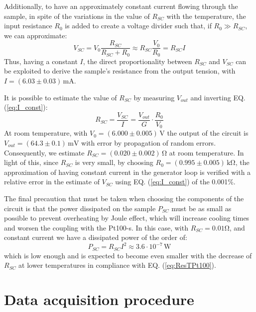 \documentclass[rmp,10pt,onecolumn,fleqn,notitlepage]{revtex4-1}
\begin{document}
Additionally, to have an approximately constant current flowing through the sample, in spite of the variations in the value of $R_{SC}$ with the temperature, the input resistance $R_0$ is added to create a voltage divider such that, if $R_0 \gg R_{SC}$, we can approximate:
\begin{equation}
    V_{SC}=V_0\frac{R_{SC}}{R_{SC}+R_0}\approx R_{SC}\frac{V_0}{R_0}=R_{SC}I
\label{eq:I_const}
\end{equation}
Thus, having a constant $I$, the direct proportionality between $R_{SC}$ and $V_{SC}$ can be exploited to derive the sample's resistance from the output tension, with $I = (6.03 \pm 0.03)\, \si{\milli \ampere}$.

It is possible to estimate the value of $R_{SC}$ by measuring $V_{out}$ and inverting EQ. (\ref{eq:I_const}):
\begin{equation}
    R_{SC} = \frac{V_{SC}}{I} = \frac{V_{out}}{G} \cdot \frac{R_0}{V_0}
    \label{eq:R_SC_estimate}
\end{equation}
At room temperature, with $V_0 = (6.000 \pm 0.005)\, \si{\volt}$ the output of the circuit is $V_{out} = (64.3 \pm 0.1)\, \si{\milli \volt}$ with error by propagation of random errors. Consequently, we estimate $R_{SC}=(0.020 \pm 0.002)\,\si{\ohm}$ at room temperature. In light of this, since $R_{SC}$ is very small, by choosing $R_0 =(0.995 \pm 0.005)\, \si{\kilo \ohm}$, the approximation of having constant current in the generator loop is verified with a relative error in the estimate of $V_{SC}$ using EQ. (\ref{eq:I_const}) of the 0.001\%.  

The final precaution that must be taken when choosing the components of the circuit is that the power dissipated on the sample $P_{SC}$ must be as small as possible to prevent overheating by Joule effect, which will increase cooling times and worsen the coupling with the Pt100-s.
In this case, with $R_{SC} = 0.01$\si{\ohm}, and constant current we have a dissipated power of the order of:
\begin{equation}
    P_{SC}=R_{SC} I^2\approx 3.6\cdot 10^{-7}\, \si{\watt}
\end{equation}
which is low enough and is expected to become even smaller with the decrease of $R_{SC}$ at lower temperatures in compliance with EQ. (\ref{eq:ResTPt100}).

\clearpage


\section{Data acquisition procedure}
\label{sec:data_acquistion_procedure}
\end{document}
